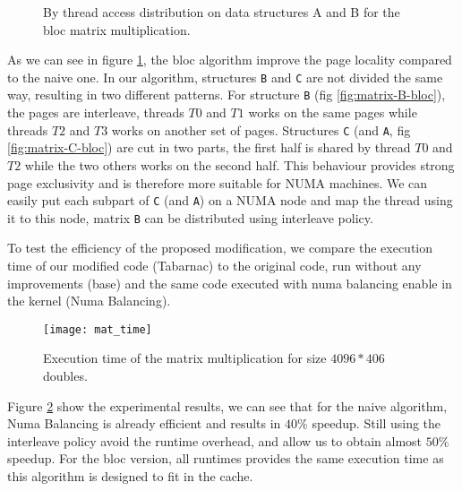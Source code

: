 \begin{figure}[htb]
    \centering
    \caption{By thread access distribution on data structures A and B for the
    bloc matrix multiplication.}
    \label{fig:matrix-bloc}
\end{figure}

As we can see in figure \ref{fig:matrix-bloc}, the bloc algorithm improve the page
locality compared to the naive one. In our algorithm, structures \texttt{B}
and \texttt{C} are not divided the same way, resulting in two different
patterns. For structure \texttt{B} (fig \ref{fig:matrix-B-bloc}), the pages
are interleave, threads $T0$ and $T1$ works on the same pages while threads
$T2$ and $T3$ works on another set of pages. Structures \texttt{C} (and
\texttt{A}, fig \ref{fig:matrix-C-bloc}) are cut in two parts, the first half
is shared by thread $T0$ and $T2$ while the two others works on the second
half. This behaviour provides strong page exclusivity and is therefore more
suitable for NUMA machines. We can easily put each subpart of \texttt{C} (and
\texttt{A}) on a NUMA node and map the thread using it to this node, matrix
\texttt{B} can be distributed using interleave policy.

To test the efficiency of the proposed modification, we compare the execution
time of our modified code (Tabarnac) to the  original code, run without any
improvements (base) and the same code executed with numa balancing enable in the
kernel (Numa Balancing).

\begin{figure}[htb]
    \centering
    \texttt{[image: mat\_time]}
    \caption{Execution time of the matrix multiplication for size $4096*406$ doubles.}
    \label{fig:matrix-res}
\end{figure}

Figure \ref{fig:matrix-res} show the experimental results, we can see that for
the naive algorithm, Numa Balancing is already efficient and results in $40\%$
speedup. Still using the interleave policy avoid the runtime overhead, and
allow us to obtain almost $50\%$ speedup. For the bloc version, all runtimes
provides the same execution time as this algorithm is designed to fit in the
cache.

